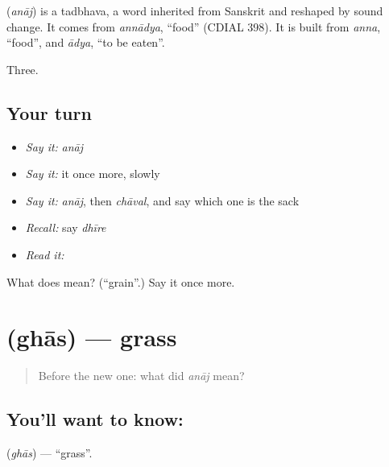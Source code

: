 \begin{cousinweb}
\textbf{} (\emph{anāj}) is a tadbhava, a word inherited from Sanskrit and reshaped by sound change. It comes from \emph{annādya}, \textquotedblleft{}food\textquotedblright{} (CDIAL 398). It is built from \emph{anna}, \textquotedblleft{}food\textquotedblright{}, and \emph{ādya}, \textquotedblleft{}to be eaten\textquotedblright{}.
\end{cousinweb}

\begin{grammarlens}[title={What you've built}]
Three.
\end{grammarlens}

\subsection*{Your turn}
\begin{itemize}
\raggedright
  \item \emph{Say it:} \emph{anāj}
  \item \emph{Say it:} it once more, slowly
  \item \emph{Say it:} \emph{anāj}, then \emph{chāval}, and say which one is the sack
  \item \emph{Recall:} say \emph{dhīre}
  \item \emph{Read it:} \textbf{}
\end{itemize}

\begin{tcolorbox}[breakable,colback=teal!4,colframe=teal!35!black,title={Before you move on}]
What does  mean? (\textquotedblleft{}grain\textquotedblright{}.) Say it once more.
\end{tcolorbox}
\section[\texorpdfstring{\hi{घास} (ghās)}{घास (ghās)}]{ (ghās) — grass}

\label{lesson:HI-C66-grass}



\begin{quote}
Before the new one: what did \emph{anāj} mean?
\end{quote}

\subsection*{You'll want to know: }
\textbf{} (\emph{ghās}) — \textquotedblleft{}grass\textquotedblright{}.

